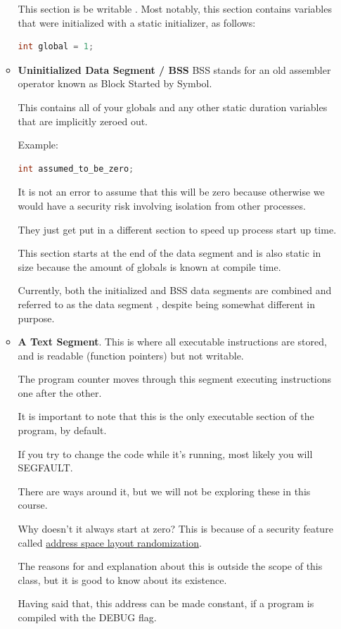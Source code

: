 \begin{itemize}
\begin{itemize}
          This section is be writable \cite[P. 124]{van1994expert}.
          Most notably, this section contains variables that were initialized with a static initializer, as follows:

\begin{lstlisting}[language=C]
int global = 1;
\end{lstlisting}

    \item \textbf{Uninitialized Data Segment / BSS}
          BSS stands for an old assembler operator known as Block Started by Symbol.

          This contains all of your globals and any other static duration variables that are implicitly zeroed out.

          Example:
\begin{lstlisting}[language=C]
int assumed_to_be_zero;
\end{lstlisting}

          It is not an error to assume that this will be zero because otherwise we would have a security risk involving isolation from other processes.

          They just get put in a different section to speed up process start up time.

          This section starts at the end of the data segment and is also static in size because the amount of globals is known at compile time.
          
          Currently, both the initialized and BSS data segments are combined and referred to as the data segment \cite[P. 124]{van1994expert}, despite being somewhat different in purpose.

    \item \textbf{A Text Segment}.
          This is where all executable instructions are stored, and is readable (function pointers) but not writable.

          The program counter moves through this segment executing instructions one after the other.

          It is important to note that this is the only executable section of the program, by default.

          If you try to change the code while it's running, most likely you will SEGFAULT.

          There are ways around it, but we will not be exploring these in this course.

          Why doesn't it always start at zero?
          This is because of a security feature called \href{https://en.wikipedia.org/wiki/Address_space_layout_randomization}{address space layout randomization}.

          The reasons for and explanation about this is outside the scope of this class, but it is good to know about its existence.

          Having said that, this address can be made constant, if a program is compiled with the DEBUG flag.
\end{itemize}
\end{itemize}


